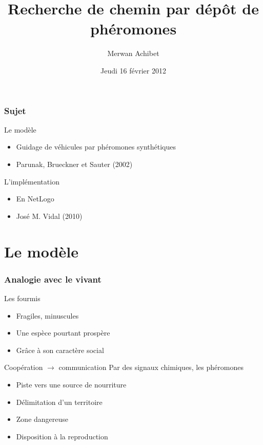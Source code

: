 \documentclass{beamer}
\title{Recherche de chemin par dépôt de phéromones}
\author{Merwan Achibet}
\institute{Université du Havre}
\date{Jeudi 16 février 2012}
\begin{document}
\maketitle

\begin{frame}

  \frametitle{Sujet}

  \begin{block}{Le modèle}
    \begin{itemize}
    \item{Guidage de véhicules par phéromones synthétiques}
    \item{Parunak, Brueckner et Sauter (2002)}
    \end{itemize}
  \end{block}

  \vfill

  \begin{block}{L'implémentation}
    \begin{itemize}
    \item{En NetLogo}
    \item{José M. Vidal (2010)}
    \end{itemize}
  \end{block}

\end{frame}

\section{Le modèle}

\begin{frame}

  \frametitle{Analogie avec le vivant}

  \begin{block}{Les fourmis}
    \begin{itemize}
    \item{Fragiles, minuscules}
    \item{Une espèce pourtant prospère}
    \item{Grâce à son caractère social}
    \end{itemize}
  \end{block}

  \vfill

  \begin{block}{Coopération $\rightarrow$ communication}
    Par des signaux chimiques, les phéromones
    \begin{itemize}
      \item{Piste vers une source de nourriture}
      \item{Délimitation d'un territoire}
      \item{Zone dangereuse}
      \item{Disposition à la reproduction}
    \end{itemize}
  \end{block}

\end{frame}
\end{document}
